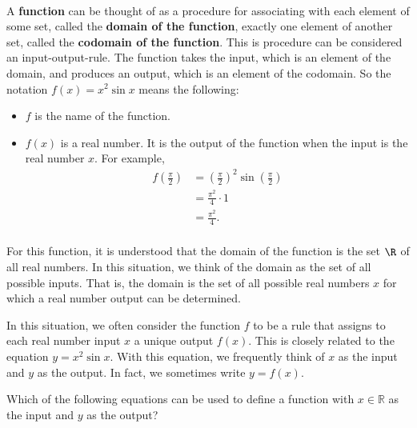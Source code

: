 \begin{previewactivity} \label{PA:previousfunctions} \hfill \\
A \textbf{function}
%
 can be thought of as a procedure for associating with each element of some set, called the \textbf{domain of the function},
%
%
 exactly one element of another set, called the \textbf{codomain of the function}.
%
%
  This is procedure can be considered an input-output-rule.  The function takes the input, which is an element of the domain, and produces an output, which is an element of the codomain.  So the notation $f( x ) = x^2 \sin x$ means the following:

\begin{itemize}
\item $f$  is the name of the function.

\item $f( x )$  is a real number.  It is the output of the function when the input is the real number  $x$.  For example,
\[
\begin{aligned}
  f\left( {\frac{\pi }{2}} \right) &= \left( {\frac{\pi }{2}} \right)^2 \sin \left( {\frac{\pi }
{2}} \right) \\ 
                                   &= \frac{{\pi ^2 }}{4} \cdot 1 \\ 
                                   &= \frac{{\pi ^2 }}{4}. \\ 
\end{aligned}
\]
\end{itemize}
For this function, it is understood that the domain of the function is the set  $\R$ of all real numbers.  In this situation, we think of the domain as the set of all possible inputs.  That is, the domain is the set of all possible real numbers  $x$  for which a real number output can be determined.

In this situation, we often consider the function  $f$  to be a rule that assigns to each real number input  $x$  a unique output  $f( x )$.  This is closely related to the equation  
$y = x^2 \sin x $.  With this equation, we frequently think of  $x$  as the input and  $y$  as the output.  In fact, we sometimes write  $y = f( x )$.

Which of the following equations can be used to define a function with  $x \in \mathbb{R}$
as the input and  $y$  as the output?

\begin{multicols}{2}
\begin{enumerate}


\end{enumerate}
\end{multicols}
\end{previewactivity}
